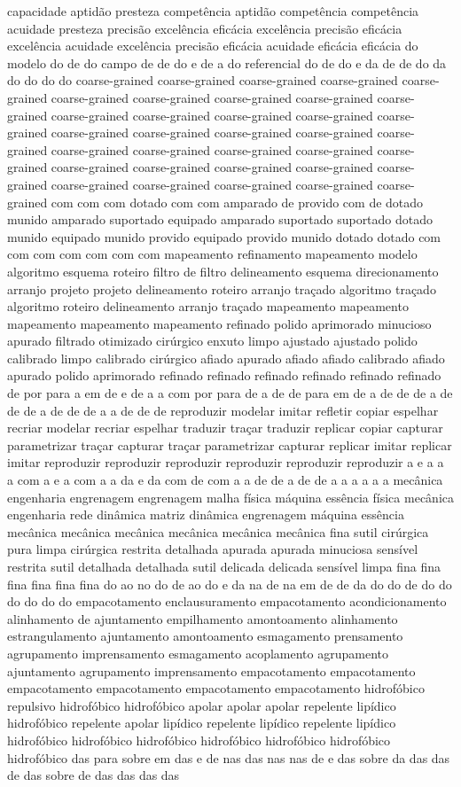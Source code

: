capacidade aptidão presteza competência aptidão competência competência acuidade presteza precisão excelência eficácia excelência precisão eficácia excelência acuidade excelência precisão eficácia acuidade eficácia eficácia do modelo do de do campo de de do e de a do referencial do de do e da de de do da do do do do coarse-grained coarse-grained coarse-grained coarse-grained coarse-grained coarse-grained coarse-grained coarse-grained coarse-grained coarse-grained coarse-grained coarse-grained coarse-grained coarse-grained coarse-grained coarse-grained coarse-grained coarse-grained coarse-grained coarse-grained coarse-grained coarse-grained coarse-grained coarse-grained coarse-grained coarse-grained coarse-grained coarse-grained coarse-grained coarse-grained coarse-grained coarse-grained coarse-grained coarse-grained coarse-grained com com com dotado com com amparado de provido com de dotado munido amparado suportado equipado amparado suportado suportado dotado munido equipado munido provido equipado provido munido dotado dotado com com com com com com com mapeamento refinamento mapeamento modelo algoritmo esquema roteiro filtro de filtro delineamento esquema direcionamento arranjo projeto projeto delineamento roteiro arranjo traçado algoritmo traçado algoritmo roteiro delineamento arranjo traçado mapeamento mapeamento mapeamento mapeamento mapeamento refinado polido aprimorado minucioso apurado filtrado otimizado cirúrgico enxuto limpo ajustado ajustado polido calibrado limpo calibrado cirúrgico afiado apurado afiado afiado calibrado afiado apurado polido aprimorado refinado refinado refinado refinado refinado refinado de por para a em de e de a a com por para de a de de para em de a de de de a de de de a de de de a a de de de reproduzir modelar imitar refletir copiar espelhar recriar modelar recriar espelhar traduzir traçar traduzir replicar copiar capturar parametrizar traçar capturar traçar parametrizar capturar replicar imitar replicar imitar reproduzir reproduzir reproduzir reproduzir reproduzir reproduzir a e a a a com a e a com a a da e da com de com a a de de a de de a a a a a a mecânica engenharia engrenagem engrenagem malha física máquina essência física mecânica engenharia rede dinâmica matriz dinâmica engrenagem máquina essência mecânica mecânica mecânica mecânica mecânica mecânica fina sutil cirúrgica pura limpa cirúrgica restrita detalhada apurada apurada minuciosa sensível restrita sutil detalhada detalhada sutil delicada delicada sensível limpa fina fina fina fina fina fina do ao no do de ao do e da na de na em de de da do do de do do do do do do empacotamento enclausuramento empacotamento acondicionamento alinhamento de ajuntamento empilhamento amontoamento alinhamento estrangulamento ajuntamento amontoamento esmagamento prensamento agrupamento imprensamento esmagamento acoplamento agrupamento ajuntamento agrupamento imprensamento empacotamento empacotamento empacotamento empacotamento empacotamento empacotamento hidrofóbico repulsivo hidrofóbico hidrofóbico apolar apolar apolar repelente lipídico hidrofóbico repelente apolar lipídico repelente lipídico repelente lipídico hidrofóbico hidrofóbico hidrofóbico hidrofóbico hidrofóbico hidrofóbico hidrofóbico das para sobre em das e de nas das nas nas de e das sobre da das das de das sobre de das das das das 